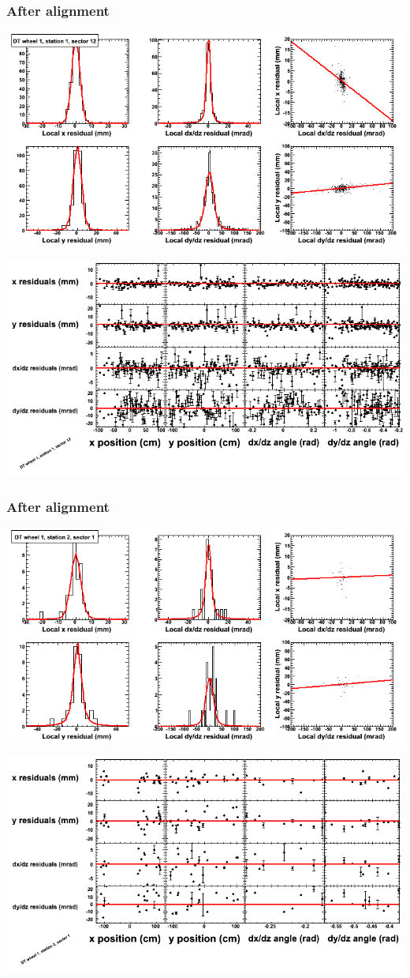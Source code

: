 \documentclass[compress]{beamer}
\begin{document}
\begin{frame}
\frametitle{After alignment}
\includegraphics[width=0.7\linewidth]{NOV4_fitfunctions/MBwhDst1sec12_bellcurves.png}

\includegraphics[width=0.7\linewidth]{NOV4_fitfunctions/MBwhDst1sec12_polynomials.png}
\end{frame}

\begin{frame}
\frametitle{After alignment}
\includegraphics[width=0.7\linewidth]{NOV4_fitfunctions/MBwhDst2sec01_bellcurves.png}

\includegraphics[width=0.7\linewidth]{NOV4_fitfunctions/MBwhDst2sec01_polynomials.png}
\end{frame}
\end{document}
